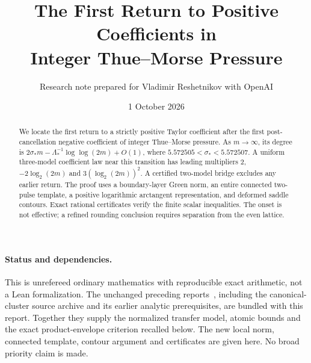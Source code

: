\documentclass[11pt,a4paper]{article}
\title{The First Return to Positive Coefficients in\\Integer Thue--Morse Pressure}
\author{Research note prepared for Vladimir Reshetnikov with OpenAI}
\date{1 October 2026}
\begin{document}
\maketitle
\begin{abstract}
We locate the first return to a strictly positive Taylor coefficient after the first post-cancellation negative coefficient of integer Thue--Morse pressure. As $m\to\infty$, its degree is $2\sigma_*m-\Lambda_*^{-1}\log\log(2m)+O(1)$, where $5.572505<\sigma_*<5.572507$. A uniform three-model coefficient law near this transition has leading multipliers $2$, $-2\log_2(2m)$ and $3(\log_2(2m))^2$. A certified two-model bridge excludes any earlier return. The proof uses a boundary-layer Green norm, an entire connected two-pulse template, a positive logarithmic arctangent representation, and deformed saddle contours. Exact rational certificates verify the finite scalar inequalities. The onset is not effective; a refined rounding conclusion requires separation from the even lattice.
\end{abstract}
\paragraph{Status and dependencies.} This is unrefereed ordinary mathematics with reproducible exact arithmetic, not a Lean formalization. The unchanged preceding reports~\cite{Clusters,First}, including the canonical-cluster source archive and its earlier analytic prerequisites, are bundled with this report. Together they supply the normalized transfer model, atomic bounds and the exact product-envelope criterion recalled below. The new local norm, connected template, contour argument and certificates are given here. No broad priority claim is made.
\end{document}
